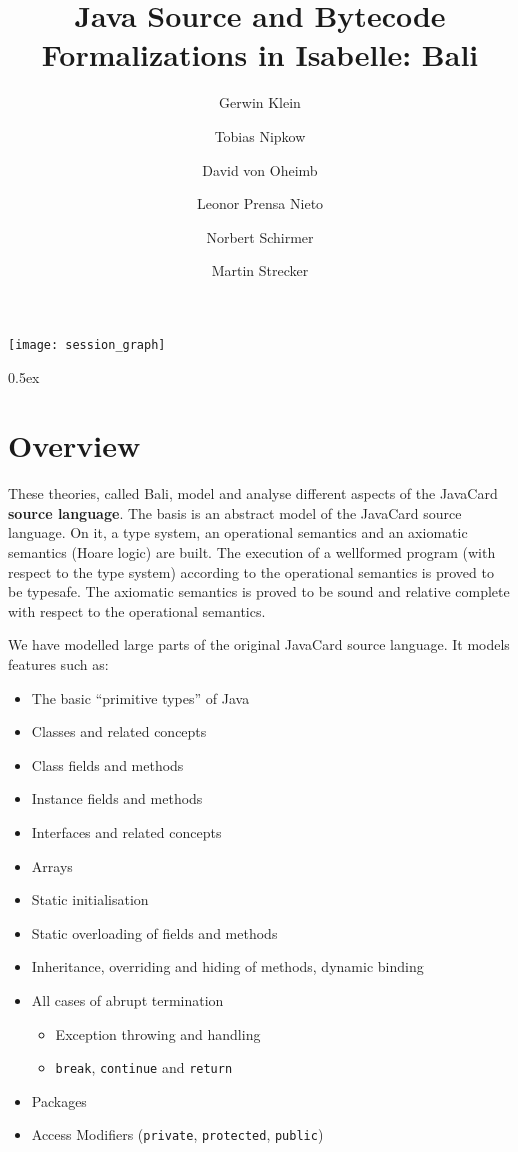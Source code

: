 \documentclass[11pt,a4paper]{book}
\begin{document}
\title{Java Source and Bytecode Formalizations in Isabelle: Bali}
\author{Gerwin Klein \and Tobias Nipkow \and David von Oheimb \and
  Leonor Prensa Nieto \and Norbert Schirmer \and Martin Strecker}
\maketitle

\tableofcontents

\begin{center}
  \texttt{[image: session\_graph]}
\end{center}

\parindent 0pt\parskip 0.5ex
\chapter{Overview}
These theories, called Bali,  model and analyse different aspects of the 
JavaCard \textbf{source language}. 
The basis is an abstract model of the JavaCard source language. 
On it, a type system, an operational semantics and an axiomatic semantics 
(Hoare logic) are built. The execution of a wellformed program (with respect to
the type system) according to the operational semantics is proved to be 
typesafe. The axiomatic semantics is proved to be sound and relative complete 
with respect to the operational semantics.

We have modelled large parts of the original JavaCard source language. It models
features such as:
\begin{itemize}
\item The basic ``primitive types'' of Java 
\item Classes and related concepts 
\item Class fields and methods
\item Instance fields and methods
\item Interfaces and related concepts 
\item Arrays
\item Static initialisation
\item Static overloading of fields and methods
\item Inheritance, overriding and hiding of methods, dynamic binding
\item All cases of abrupt termination
      \begin{itemize}
        \item Exception throwing and handling
        \item \texttt{break}, \texttt{continue} and \texttt{return} 
      \end{itemize}
\item Packages
\item Access Modifiers (\texttt{private}, \texttt{protected}, \texttt{public})
\end{itemize}
\end{document}
